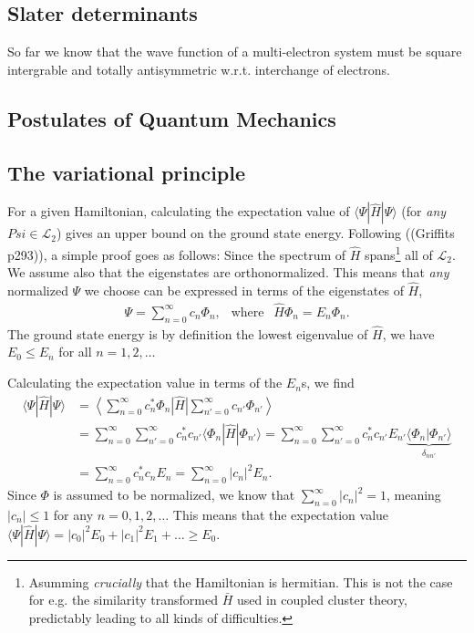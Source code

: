 \documentclass[a4paper]{article}
\newcommand{\nn}{\nonumber}
\begin{document}
\subsection{Slater determinants}
So far we know that the wave function of a multi-electron system must be square intergrable and totally antisymmetric w.r.t. interchange of electrons. 










\subsection{Postulates of Quantum Mechanics \label{postulates}}


\subsection{The variational principle}
For a given Hamiltonian, calculating the expectation value of $\langle \Psi | \hat H | \Psi\rangle$ (for \emph{any} $Psi\in\mathcal{L}_2$) gives an upper bound on the ground state energy. Following ((Griffits p293)), a simple proof goes as follows: Since the spectrum of $\hat H$ spans\footnote{Asumming \emph{crucially} that the Hamiltonian is hermitian. This is not the case for e.g. the similarity transformed $\bar H$ used in coupled cluster theory, predictably leading to all kinds of difficulties.} all of $\mathcal{L}_2$. We assume also that the eigenstates are orthonormalized. This means that \emph{any} normalized $\Psi$ we choose can be expressed in terms of the eigenstates of $\hat H$,
\begin{align}
\Psi = \sum_{n=0}^\infty c_n \Phi_n, \ \ \text{ where } \ \ \hat H \Phi_n = E_n \Phi_n.
\end{align}
The ground state energy is by definition the lowest eigenvalue of $\hat H$, we have $E_0\le E_n$ for all $n=1,2,\dots$

Calculating the expectation value in terms of the $E_n$s, we find
\begin{align}
\big\langle \Psi | \hat H | \Psi\big\rangle &= \left\langle \sum_{n=0}^\infty c_n^* \Phi_n \right| \hat H \left| \sum_{n'=0}^\infty c_{n'} \Phi_{n'} \right\rangle \nn\\
%
&= \sum_{n=0}^\infty\sum_{n'=0}^\infty c_n^* c_{n'} \big\langle \Phi_n | \hat H | \Phi_{n'}\big\rangle = \sum_{n=0}^\infty\sum_{n'=0}^\infty c_n^* c_{n'} E_{n'} \underbrace{\big\langle \Phi_n | \Phi_{n'}\big\rangle}_{\delta_{nn'}} \nn\\
%
&= \sum_{n=0}^\infty c_n^* c_n E_n = \sum_{n=0}^\infty |c_n|^2 E_n.
\end{align}
Since $\Phi$ is assumed to be normalized, we know that $\sum_{n=0}^\infty |c_n|^2=1$, meaning $|c_n|\le 1$ for any $n=0,1,2,\dots$ This means that the expectation value $\langle \Psi | \hat H | \Psi\rangle = |c_0|^2E_0 + |c_1|^2E_1+\dots \ge E_0$. 
\end{document}
